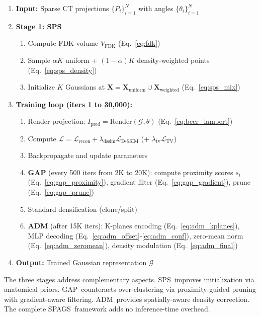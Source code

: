 \documentclass{egPublStyle}
\newcommand{\spags}{SPAGS}
\newcommand{\sps}{SPS}
\newcommand{\gap}{GAP}
\newcommand{\adm}{ADM}
\begin{document}
\begin{algorithm}[t]
\caption{SPAGS Training Pipeline}
\label{alg:spags}
\small
\begin{enumerate}
  \item \textbf{Input:} Sparse CT projections $\{P_i\}_{i=1}^{N}$ with angles $\{\theta_i\}_{i=1}^{N}$
  \item \textbf{Stage 1: SPS}
    \begin{enumerate}
      \item Compute FDK volume $V_{\text{FDK}}$ (Eq.~\ref{eq:fdk})
      \item Sample $\alpha K$ uniform + $(1-\alpha)K$ density-weighted points (Eq.~\ref{eq:sps_density})
      \item Initialize $K$ Gaussians at $\mathbf{X} = \mathbf{X}_{\text{uniform}} \cup \mathbf{X}_{\text{weighted}}$ (Eq.~\ref{eq:sps_mix})
    \end{enumerate}
  \item \textbf{Training loop (iters 1 to 30,000):}
    \begin{enumerate}
      \item Render projection: $I_{\text{pred}} = \text{Render}(\mathcal{G}, \theta)$ (Eq.~\ref{eq:beer_lambert})
      \item Compute $\mathcal{L} = \mathcal{L}_{\text{recon}} + \lambda_{\text{dssim}}\mathcal{L}_{\text{D-SSIM}}$ (+ $\lambda_{\text{tv}}\mathcal{L}_{\text{TV}}$)
      \item Backpropagate and update parameters
      \item \textbf{GAP} (every 500 iters from 2K to 20K): compute proximity scores $s_i$ (Eq.~\ref{eq:gap_proximity}), gradient filter (Eq.~\ref{eq:gap_gradient}), prune (Eq.~\ref{eq:gap_prune})
      \item Standard densification (clone/split)
      \item \textbf{ADM} (after 15K iters): K-planes encoding (Eq.~\ref{eq:adm_kplanes}), MLP decoding (Eq.~\ref{eq:adm_offset}-\ref{eq:adm_conf}), zero-mean norm (Eq.~\ref{eq:adm_zeromean}), density modulation (Eq.~\ref{eq:adm_final})
    \end{enumerate}
  \item \textbf{Output:} Trained Gaussian representation $\mathcal{G}$
\end{enumerate}
\end{algorithm}

The three stages address complementary aspects. \sps\ improves initialization via anatomical priors. \gap\ counteracts over-clustering via proximity-guided pruning with gradient-aware filtering. \adm\ provides spatially-aware density correction. The complete \spags\ framework adds no inference-time overhead.
\end{document}
